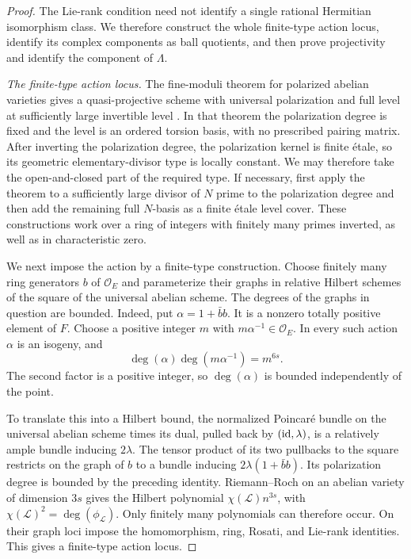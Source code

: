 \begin{proof}
The Lie-rank condition need not identify a single rational Hermitian
isomorphism class.  We therefore construct the whole finite-type
action locus, identify its complex components as ball quotients, and
then prove projectivity and identify the component of \(\Lambda\).

\emph{The finite-type action locus.}
The fine-moduli theorem for polarized abelian varieties gives a
quasi-projective scheme with universal polarization and full level at
sufficiently large invertible level
\cite[Chapter~7, Definitions~7.1--7.2, Proposition~7.6, and
Theorem~7.9]{MumfordFogarty1982}.
In that theorem the polarization degree is fixed and the level is an
ordered torsion basis, with no prescribed pairing matrix.  After
inverting the polarization degree, the polarization kernel is finite
étale, so its geometric elementary-divisor type is locally constant.
We may therefore take the open-and-closed part of the required type.
If necessary, first apply the theorem to a sufficiently large divisor
of \(N\) prime to the polarization degree and then add the remaining
full \(N\)-basis as a finite étale level cover.  These constructions
work over a ring of integers with finitely many primes inverted, as
well as in characteristic zero.

We next impose the action by a finite-type construction.  Choose
finitely many ring generators \(b\) of \(\mathcal O_E\) and
parameterize their graphs in relative Hilbert schemes of the square
of the universal abelian scheme.  The degrees of the graphs in
question are bounded.  Indeed, put \(\alpha=1+\bar b b\).  It is a
nonzero totally positive element of \(F\).  Choose a positive integer
\(m\) with \(m\alpha^{-1}\in\mathcal O_E\).  In every such action
\(\alpha\) is an isogeny, and
\[
\deg(\alpha)\deg(m\alpha^{-1})=m^{6s}.
\]
The second factor is a positive integer, so \(\deg(\alpha)\) is
bounded independently of the point.

To translate this into a Hilbert bound, the normalized Poincaré bundle
on the universal abelian scheme times its dual, pulled back by
\((\operatorname{id},\lambda)\), is a relatively ample bundle inducing \(2\lambda\).
The tensor product of its two pullbacks to the square restricts on the graph of
\(b\) to a bundle inducing \(2\lambda(1+\bar b b)\).  Its polarization
degree is bounded by the preceding identity.  Riemann--Roch on an
abelian variety of dimension \(3s\) gives the Hilbert polynomial
\(\chi(\mathcal L)n^{3s}\), with
\(\chi(\mathcal L)^2=\deg(\phi_{\mathcal L})\).  Only finitely many
polynomials can therefore occur.  On their graph loci impose the
homomorphism, ring, Rosati, and Lie-rank identities.  This gives a
finite-type action locus.


\end{proof}

